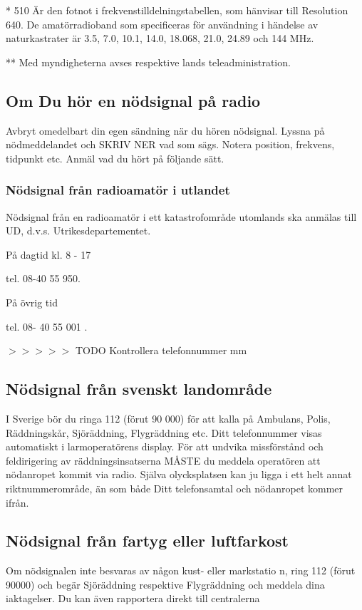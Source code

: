 * 510 Är den fotnot i frekvenstilldelningstabellen, som hänvisar till
Resolution 640. De amatörradioband som specificeras för användning i
händelse av naturkastrater är 3.5, 7.0, 10.1, 14.0, 18.068, 21.0,
24.89 och 144 MHz.

** Med myndigheterna avses respektive lands teleadministration.

\subsection{Om Du hör en nödsignal på radio}

Avbryt omedelbart din egen sändning när du hören nödsignal. Lyssna på
nödmeddelandet och SKRIV NER vad som sägs. Notera position, frekvens, tidpunkt
etc. Anmäl vad du hört på följande sätt.

\subsubsection{Nödsignal från radioamatör i utlandet}

Nödsignal från en radioamatör i ett katastrofområde utomlands ska anmälas till UD, d.v.s.
Utrikesdepartementet.

På dagtid kl. 8 - 17

tel. 08-40 55 950.

På övrig tid

tel. 08- 40 55 001 .

$>>>>>$ TODO Kontrollera telefonnummer mm

\subsection{Nödsignal från svenskt landområde}

I Sverige bör du ringa 112 (förut 90 000) för att kalla på Ambulans, Polis,
Räddningskår, Sjöräddning, Flygräddning etc. Ditt telefonnummer visas
automatiskt i larmoperatörens display.  För att undvika missförstånd och
feldirigering av räddningsinsatserna MÅSTE du meddela operatören att nödanropet
kommit via radio. Själva olycksplatsen kan ju ligga i ett helt annat
riktnummerområde, än som både Ditt telefonsamtal och nödanropet kommer ifrån.

\subsection{Nödsignal från fartyg eller luftfarkost}

Om nödsignalen inte besvaras av någon kust- eller markstatio n, ring 112
(förut 90000) och begär Sjöräddning respektive Flygräddning och meddela dina
iaktagelser. Du kan även rapportera direkt till centralerna

